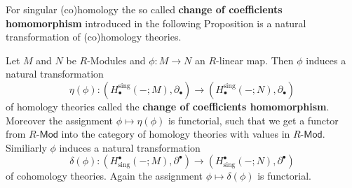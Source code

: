For singular (co)homology the so called \textbf{change of coefficients homomorphism} introduced in the following Proposition is a natural transformation of (co)homology theories.

\begin{proposition}
    Let $M$ and $N$ be $R$-Modules and $\phi \colon M \to N$ an $R$-linear map. Then $\phi$ induces a natural transformation 
    \[
    \eta(\phi) \colon (H_\bullet^\mathrm{sing}(-;M),\partial_\bullet) \to (H_\bullet^\mathrm{sing}(-;N),\partial_\bullet)
    \]
    of homology theories called the \textbf{change of coefficients homomorphism}. Moreover the assignment $\phi \mapsto \eta(\phi)$ is functorial, such that we get a functor from $R$-$\mathsf{Mod}$ into the category of homology theories with values in $R$-$\mathsf{Mod}$. Similiarly $\phi$ induces a natural transformation 
    \[
    \delta(\phi) \colon (H^\bullet_\mathrm{sing}(-;M),\partial^\bullet) \to (H^\bullet_\mathrm{sing}(-;N),\partial^\bullet)
    \]
    of cohomology theories. Again the assignment $\phi \mapsto \delta(\phi)$ is functorial.
\end{proposition}

